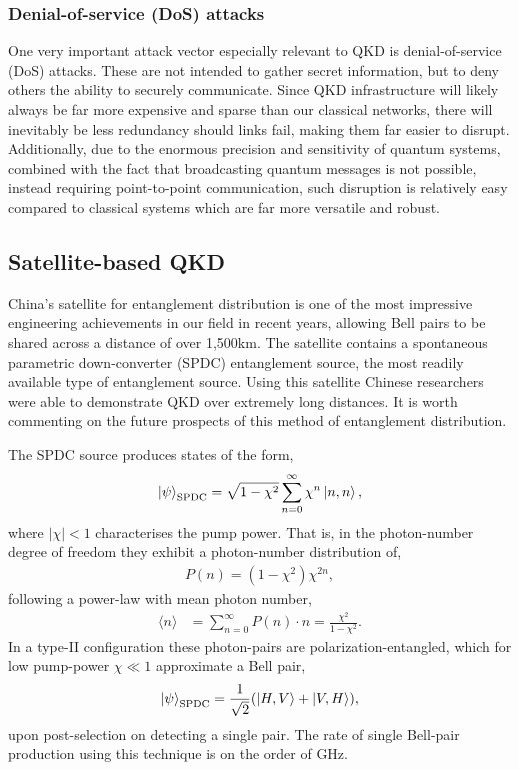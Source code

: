 \subsubsection{Denial-of-service (DoS) attacks} \label{denial-of-service-dos-attacks}

One very important attack vector especially relevant to QKD is denial-of-service (DoS) attacks. These are not intended to gather secret information, but to deny others the ability to securely communicate. Since QKD infrastructure will likely always be far more expensive and sparse than our classical networks, there will inevitably be less redundancy should links fail, making them far easier to disrupt. Additionally, due to the enormous precision and sensitivity of quantum systems, combined with the fact that broadcasting quantum messages is not possible, instead requiring point-to-point communication, such disruption is relatively easy compared to classical systems which are far more versatile and robust.

\subsection{Satellite-based QKD} \label{satellite-qkd}

China's satellite for entanglement distribution is one of the most impressive engineering achievements in our field in recent years, allowing Bell pairs to be shared across a distance of over 1,500km. The satellite contains a spontaneous parametric down-converter (SPDC) entanglement source, the most readily available type of entanglement source. Using this satellite Chinese researchers were able to demonstrate QKD over extremely long distances. It is worth commenting on the future prospects of this method of entanglement distribution.

The SPDC source produces states of the form,
\begin{align} \label{eq:SPDC}
	\ket\psi_\mathrm{SPDC} = \sqrt{1-\chi^2}\sum_{n=0}^\infty \chi^n \ket{n,n},
\end{align}
where $|\chi|<1$ characterises the pump power. That is, in the photon-number degree of freedom they exhibit a photon-number distribution of,
\begin{align} \label{eq:SPDC_number}
P(n) = (1-\chi^2)\chi^{2n},
\end{align}
following a power-law with mean photon number,
\begin{align}
	\langle n \rangle &= \sum_{n=0}^\infty P(n) \cdot n = \frac{\chi^2}{1-\chi^2}.
\end{align}
In a type-II configuration \cite{???} these photon-pairs are polarization-entangled, which for low pump-power $\chi\ll 1$ approximate a Bell pair,
\begin{align}
	\ket\psi_\mathrm{SPDC} = \frac{1}{\sqrt{2}}(\ket{H,V} + \ket{V,H}),
\end{align}
upon post-selection on detecting a single pair. The rate of single Bell-pair production using this technique is on the order of GHz.

